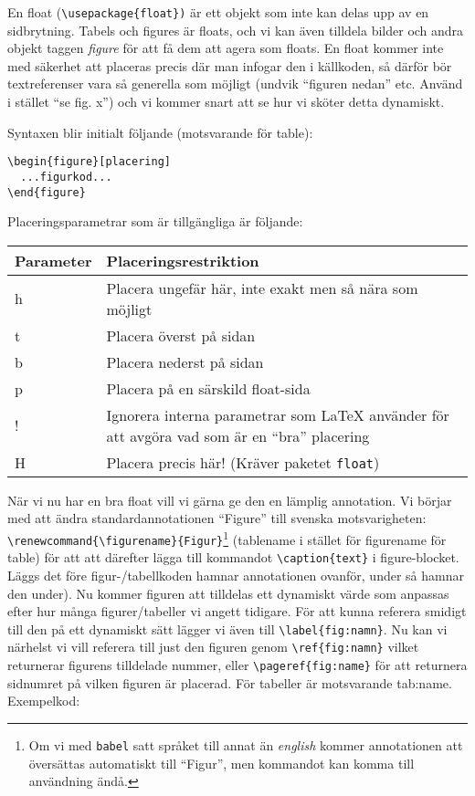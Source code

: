 En float (\verb+\usepackage{float})+ är ett objekt som inte kan delas upp av en sidbrytning. Tabels och figures är floats, och vi kan även tilldela bilder och andra objekt taggen \emph{figure} för att få dem att agera som floats. En float kommer inte med säkerhet att placeras precis där man infogar den i källkoden, så därför bör textreferenser vara så generella som möjligt (undvik ``figuren nedan'' etc. Använd i stället ``se fig. x'') och vi kommer snart att se hur vi sköter detta dynamiskt.

Syntaxen blir initialt följande (motsvarande för table):
\begin{verbatim}
\begin{figure}[placering]
  ...figurkod...
\end{figure}
\end{verbatim}

Placeringsparametrar som är tillgängliga är följande:


\begin{tabular}{|l|p{13.5cm}|}
    \hline
    Parameter & Placeringsrestriktion \\
    \hline
    h & Placera ungefär här, inte exakt men så nära som möjligt\\
    t & Placera överst på sidan\\
    b & Placera nederst på sidan\\
    p & Placera på en särskild float-sida\\
    ! & Ignorera interna parametrar som \LaTeX{} använder för att avgöra vad som är en ``bra'' placering\\
    H & Placera precis här! (Kräver paketet \verb+float+)\\
    \hline
    \end{tabular}

När vi nu har en bra float vill vi gärna ge den en lämplig annotation. Vi börjar med att ändra standardannotationen ``Figure'' till svenska motsvarigheten: \verb+\renewcommand{\figurename}{Figur}+\footnote{Om vi med \texttt{babel} satt språket till annat än \emph{english} kommer annotationen att översättas automatiskt till ``Figur'', men kommandot kan komma till användning ändå.} (tablename i stället för figurename för table) för att att därefter lägga till kommandot \verb+\caption{text}+ i figure-blocket. Läggs det före figur-/tabellkoden hamnar annotationen ovanför, under så hamnar den under). Nu kommer figuren att tilldelas ett dynamiskt värde som anpassas efter hur många figurer/tabeller vi angett tidigare. För att kunna referera smidigt till den på ett dynamiskt sätt lägger vi även till \verb+\label{fig:namn}+. Nu kan vi närhelst vi vill referera till just den figuren genom \verb+\ref{fig:namn}+ vilket returnerar figurens tilldelade nummer, eller \verb+\pageref{fig:name}+ för att returnera sidnumret på vilken figuren är placerad. För tabeller är motsvarande tab:name. Exempelkod:

